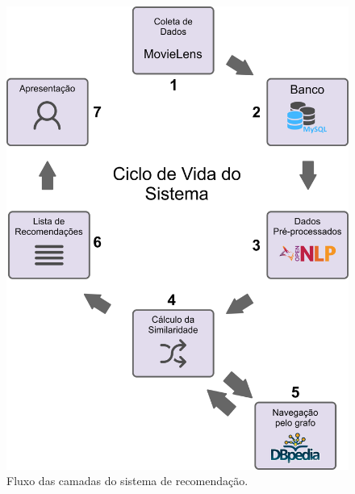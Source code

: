 \begin{figure}
	\centering
	\includegraphics[scale=0.28]{imagens/recsys_fluxo.png}
	\caption{Fluxo das camadas do sistema de recomendação.}
	\label{fig:recsys_fluxo}
\end{figure}


